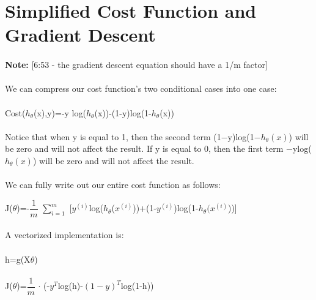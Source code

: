 \documentclass[UTF8]{ctexart}
\begin{document}
\section{Simplified Cost Function and Gradient Descent}
\paragraph{}
\textbf{Note:} [6:53 - the gradient descent equation should have a 1/m factor]
\paragraph{}
We can compress our cost function's two conditional cases into one case:
\paragraph{}
Cost($h_{\theta}$(x),y)=-y log($h_{\theta}$(x))-(1-y)log(1-$h_{\theta}$(x))
\paragraph{}
Notice that when y is equal to 1, then the second term (1−y)log(1−$h_{\theta}(x)$) will be zero and will not affect the result. If y is equal to 0, then the first term −ylog($h_{\theta}(x)$) will be zero and will not affect the result.
\paragraph{}
We can fully write out our entire cost function as follows:
\begin{algorithm}
J($\theta$)=-$\dfrac{1}{m}$ $\sum\limits_{i=1}^{m}$ [$y^{(i)}$log($h_{\theta}$($x^{(i)}$))+(1-$y^{(i)}$)log(1-$h_{\theta}(x^{(i)}$))]
\end{algorithm}
\paragraph{}
A vectorized implementation is:
\paragraph{}
\begin{algorithm}
\paragraph{}
h=g(X$\theta$)
\paragraph{}
J($\theta$)=$\dfrac{1}{m}$ $\cdot$ (-$y^{T}$log(h)-$(1-y)^{T}$log(1-h))
\end{algorithm}
\end{document}
